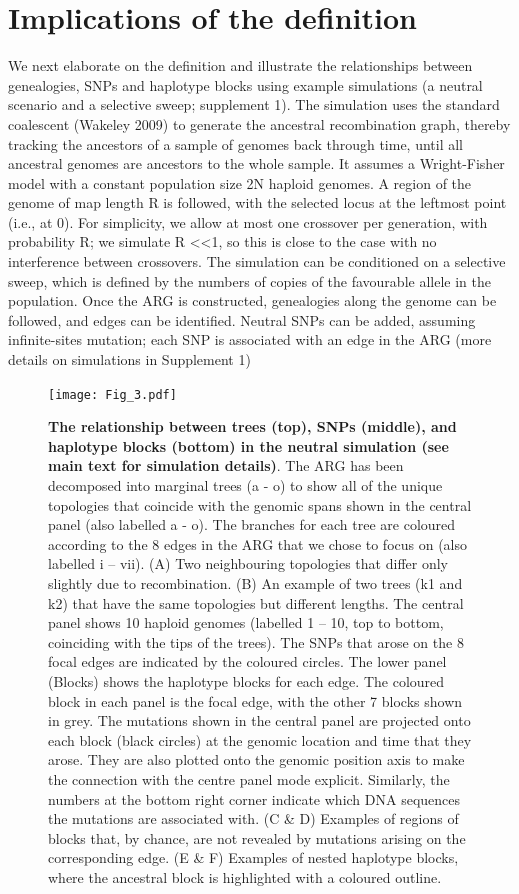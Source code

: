 \documentclass[twocolumn]{bmcart}%
\begin{document}
\section*{Implications of the definition}
We next elaborate on the definition and illustrate the relationships between genealogies, SNPs and haplotype blocks using example simulations (a neutral scenario and a selective sweep; supplement 1). The simulation uses the standard coalescent (Wakeley 2009) to generate the ancestral recombination graph, thereby tracking the ancestors of a sample of genomes back through time, until all ancestral genomes are ancestors to the whole sample. It assumes a Wright-Fisher model with a constant population size 2N haploid genomes. A region of the genome of map length R is followed, with the selected locus at the leftmost point (i.e., at 0). For simplicity, we allow at most one crossover per generation, with probability R; we simulate R <<1, so this is close to the case with no interference between crossovers. The simulation can be conditioned on a selective sweep, which is defined by the numbers of copies of the favourable allele in the population. Once the ARG is constructed, genealogies along the genome can be followed, and edges can be identified. Neutral SNPs can be added, assuming infinite-sites mutation; each SNP is associated with an edge in the ARG (more details on simulations in Supplement 1)

\begin{figure}
    \texttt{[image: Fig\_3.pdf]}
    \caption{\footnotesize{\textbf{The relationship between trees (top), SNPs (middle), and haplotype blocks (bottom) in the neutral simulation (see main text for simulation details)}. The ARG has been decomposed into marginal trees (a - o) to show all of the unique topologies that coincide with the genomic spans shown in the central panel (also labelled a - o). The branches for each tree are coloured according to the 8 edges in the ARG that we chose to focus on (also labelled i – vii).  (A) Two neighbouring topologies that differ only slightly due to recombination. (B) An example of two trees (k1 and k2) that have the same topologies but different lengths. The central panel shows 10 haploid genomes (labelled 1 – 10, top to bottom, coinciding with the tips of the trees). The SNPs that arose on the 8 focal edges are indicated by the coloured circles. The lower panel (Blocks) shows the haplotype blocks for each edge. The coloured block in each panel is the focal edge, with the other 7 blocks shown in grey. The mutations shown in the central panel are projected onto each block (black circles) at the genomic location and time that they arose. They are also plotted onto the genomic position axis to make the connection with the centre panel mode explicit. Similarly, the numbers at the bottom right corner indicate which DNA sequences the mutations are associated with. (C \& D) Examples of regions of blocks that, by chance, are not revealed by mutations arising on the corresponding edge. (E \& F) Examples of nested haplotype blocks, where the ancestral block is highlighted with a coloured outline.}}
    \label{fig:2}
\end{figure}
\end{document}
